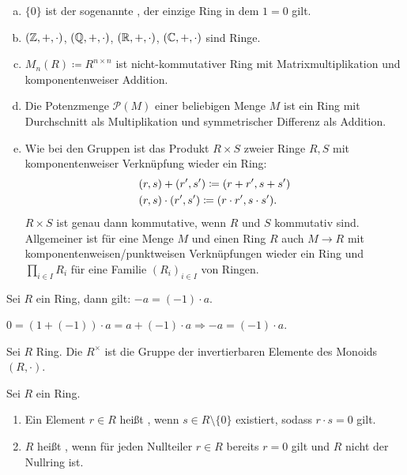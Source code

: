 \begin{beispiel}
  \begin{enumerate}[(a)]
  \item \(\{0\}\) ist der sogenannte , der einzige Ring in dem \(1=0\) gilt.
  \item \((\mathbb{Z},+,\cdot)\), \((\mathbb{Q},+,\cdot)\), \((\mathbb{R},+,\cdot)\), \((\mathbb{C},+,\cdot)\) sind Ringe.
  \item \(M_n(R)\coloneq R^{n\times n}\) ist nicht-kommutativer Ring mit Matrixmultiplikation und komponentenweiser Addition.
  \item Die Potenzmenge \(\mathcal P(M)\) einer beliebigen Menge \(M\) ist ein Ring mit Durchschnitt als Multiplikation und symmetrischer Differenz als Addition.
  \item Wie bei den Gruppen ist das Produkt \(R\times S\) zweier Ringe \(R,S\) mit komponentenweiser Verknüpfung wieder ein Ring:
  \begin{align*}
  & (r,s)+(r^\prime,s^\prime)\coloneq (r+r^\prime,s+s^\prime) \\
  & (r,s)\cdot (r^\prime,s^\prime)\coloneq (r\cdot r^\prime,s\cdot s^\prime)\rlap{.}
\end{align*}
\(R\times S\) ist genau dann kommutative, wenn \(R\) und \(S\) kommutativ sind.
Allgemeiner ist für eine Menge \(M\) und einen Ring \(R\) auch \(M\to R\) mit komponentenweisen/punktweisen Verknüpfungen wieder ein Ring und \(\prod_{i\in I}R_i\) für eine Familie \((R_i)_{i\in I}\) von Ringen.
  \end{enumerate}
\end{beispiel}

\begin{bemerkung}
  Sei \(R\) ein Ring, dann gilt: \(-a=(-1)\cdot a\).
\end{bemerkung}

\begin{beweis}
  \(0=(1+(-1))\cdot a=a+(-1)\cdot a \Rightarrow -a=(-1)\cdot a\).
\end{beweis}

\begin{definition}
  Sei \(R\) Ring.
  Die  \(R^\times\) ist die Gruppe der invertierbaren Elemente des Monoids \((R,\cdot)\).
\end{definition}

\begin{definition}
  Sei \(R\) ein Ring.
  \begin{enumerate}
  \item Ein Element \(r\in R\) heißt , wenn \(s\in R\setminus\{0\}\) existiert, sodass \(r\cdot s=0\) gilt.
  \item \(R\) heißt , wenn für jeden Nullteiler \(r\in R\) bereits \(r=0\) gilt und \(R\) nicht der Nullring ist.
  \end{enumerate}
\end{definition}

